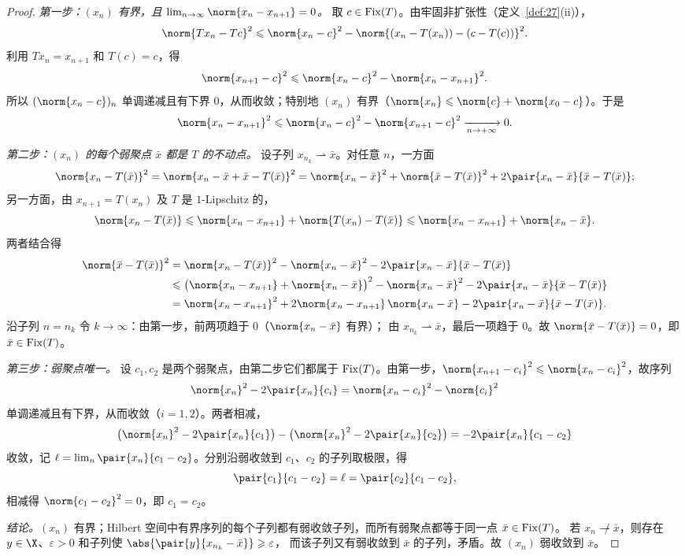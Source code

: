 \begin{proof}
\emph{第一步：$(x_n)$ 有界，且 $\lim_{n\to\infty}\norm{x_n-x_{n+1}}=0$。}
取 $c\in\operatorname{Fix}(T)$。由牢固非扩张性（定义~\ref{def:27}(ii)），
\[
  \norm{Tx_n-Tc}^2\leqslant\norm{x_n-c}^2-\norm{(x_n-T(x_n))-(c-T(c))}^2 .
\]
利用 $Tx_n=x_{n+1}$ 和 $T(c)=c$，得
\begin{equation*}
  \norm{x_{n+1}-c}^2\leqslant\norm{x_n-c}^2-\norm{x_n-x_{n+1}}^2 .
\end{equation*}
所以 $(\norm{x_n-c})_{n}$ 单调递减且有下界 $0$，从而收敛；特别地 $(x_n)$ 有界（$\norm{x_n}\leqslant\norm{c}+\norm{x_0-c}$）。于是
\[
  \norm{x_n-x_{n+1}}^2\leqslant\norm{x_n-c}^2-\norm{x_{n+1}-c}^2\xrightarrow[n\to+\infty]{}0 .
\]

\emph{第二步：$(x_n)$ 的每个弱聚点 $\bar x$ 都是 $T$ 的不动点。}
设子列 $x_{n_k}\rightharpoonup\bar x$。对任意 $n$，一方面
\[
  \norm{x_n-T(\bar x)}^2=\norm{x_n-\bar x+\bar x-T(\bar x)}^2
  =\norm{x_n-\bar x}^2+\norm{\bar x-T(\bar x)}^2+2\pair{x_n-\bar x}{\bar x-T(\bar x)} ;
\]
另一方面，由 $x_{n+1}=T(x_n)$ 及 $T$ 是 $1$-Lipschitz 的，
\[
  \norm{x_n-T(\bar x)}\leqslant\norm{x_n-x_{n+1}}+\norm{T(x_n)-T(\bar x)}\leqslant\norm{x_n-x_{n+1}}+\norm{x_n-\bar x}.
\]
两者结合得
\[
  \begin{aligned}
  \norm{\bar x-T(\bar x)}^2
  &=\norm{x_n-T(\bar x)}^2-\norm{x_n-\bar x}^2-2\pair{x_n-\bar x}{\bar x-T(\bar x)}\\
  &\leqslant\bigl(\norm{x_n-x_{n+1}}+\norm{x_n-\bar x}\bigr)^2-\norm{x_n-\bar x}^2-2\pair{x_n-\bar x}{\bar x-T(\bar x)}\\
  &=\norm{x_n-x_{n+1}}^2+2\norm{x_n-x_{n+1}}\,\norm{x_n-\bar x}-2\pair{x_n-\bar x}{\bar x-T(\bar x)} .
  \end{aligned}
\]
沿子列 $n=n_k$ 令 $k\to\infty$：由第一步，前两项趋于 $0$（$\norm{x_n-\bar x}$ 有界）；
由 $x_{n_k}\rightharpoonup\bar x$，最后一项趋于 $0$。故 $\norm{\bar x-T(\bar x)}=0$，即 $\bar x\in\operatorname{Fix}(T)$。

\emph{第三步：弱聚点唯一。}
设 $c_1,c_2$ 是两个弱聚点，由第二步它们都属于 $\operatorname{Fix}(T)$。由第一步，$\norm{x_{n+1}-c_i}^2\leqslant\norm{x_n-c_i}^2$，故序列
\[
  \norm{x_n}^2-2\pair{x_n}{c_i}=\norm{x_n-c_i}^2-\norm{c_i}^2
\]
单调递减且有下界，从而收敛（$i=1,2$）。两者相减，
\[
  \bigl(\norm{x_n}^2-2\pair{x_n}{c_1}\bigr)-\bigl(\norm{x_n}^2-2\pair{x_n}{c_2}\bigr)=-2\pair{x_n}{c_1-c_2}
\]
收敛，记 $\ell=\lim_n\pair{x_n}{c_1-c_2}$。分别沿弱收敛到 $c_1$、$c_2$ 的子列取极限，得
\[
  \pair{c_1}{c_1-c_2}=\ell=\pair{c_2}{c_1-c_2},
\]
相减得 $\norm{c_1-c_2}^2=0$，即 $c_1=c_2$。

\emph{结论。}$(x_n)$ 有界；Hilbert 空间中有界序列的每个子列都有弱收敛子列，而所有弱聚点都等于同一点 $\bar x\in\operatorname{Fix}(T)$。
若 $x_n\not\rightharpoonup\bar x$，则存在 $y\in\X$、$\varepsilon>0$ 和子列使 $\abs{\pair{y}{x_{n_k}-\bar x}}\geqslant\varepsilon$，
而该子列又有弱收敛到 $\bar x$ 的子列，矛盾。故 $(x_n)$ 弱收敛到 $\bar x$。
\end{proof}

